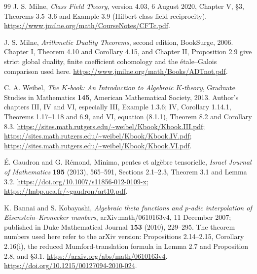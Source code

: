 \begin{thebibliography}{99}
J. S. Milne, \emph{Class Field Theory}, version 4.03,
6 August 2020, Chapter V, \S3, Theorems 3.5--3.6 and
Example 3.9 (Hilbert class field reciprocity).
\url{https://www.jmilne.org/math/CourseNotes/CFTc.pdf}.

J. S. Milne, \emph{Arithmetic Duality Theorems}, second edition,
BookSurge, 2006. Chapter I, Theorem 4.10 and Corollary 4.15,
and Chapter II, Proposition 2.9 give strict global duality, finite
coefficient cohomology and the \'etale--Galois comparison used here.
\url{https://www.jmilne.org/math/Books/ADTnot.pdf}.

C. A. Weibel, \emph{The $K$-book: An Introduction to Algebraic $K$-theory},
Graduate Studies in Mathematics \textbf{145}, American Mathematical
Society, 2013. Author's chapters III, IV and VI, especially III,
Example 1.3.6; IV,
Corollary 1.14.1, Theorems 1.17--1.18 and 6.9, and VI,
equation (8.1.1), Theorem 8.2 and Corollary 8.3.
\url{https://sites.math.rutgers.edu/~weibel/Kbook/Kbook.III.pdf};
\url{https://sites.math.rutgers.edu/~weibel/Kbook/Kbook.IV.pdf};
\url{https://sites.math.rutgers.edu/~weibel/Kbook/Kbook.VI.pdf}.

\'E. Gaudron and G. R\'emond, Minima, pentes et alg\`ebre tensorielle,
\emph{Israel Journal of Mathematics} \textbf{195} (2013), 565--591,
Sections 2.1--2.3, Theorem 3.1 and Lemma 3.2.
\url{https://doi.org/10.1007/s11856-012-0109-x};
\url{https://lmbp.uca.fr/~gaudron/art10.pdf}.



















K. Bannai and S. Kobayashi,
\emph{Algebraic theta functions and $p$-adic interpolation of
Eisenstein--Kronecker numbers},
arXiv:math/0610163v4, 11 December 2007;
published in Duke Mathematical Journal \textbf{153} (2010), 229--295.
The theorem numbers used here refer to the arXiv version:
Propositions 2.14--2.15, Corollary 2.16(i),
the reduced Mumford-translation formula in Lemma 2.7 and
Proposition 2.8, and \S3.1.
\url{https://arxiv.org/abs/math/0610163v4}.
\url{https://doi.org/10.1215/00127094-2010-024}.


\end{thebibliography}
